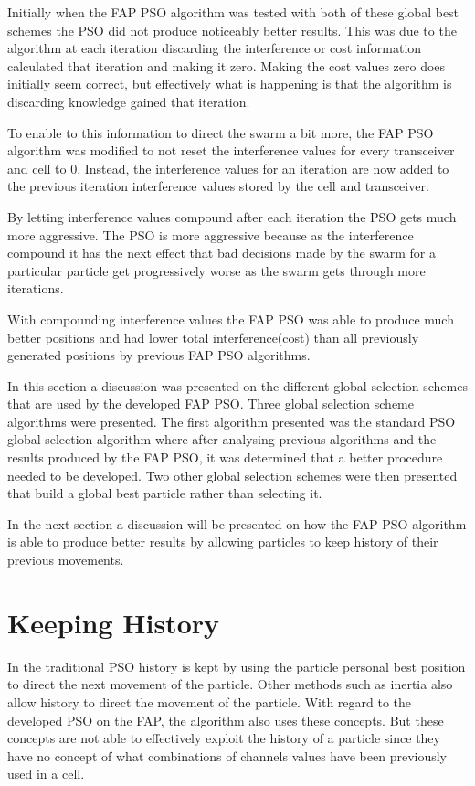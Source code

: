 Initially when the FAP PSO algorithm was tested with both of these global best schemes the PSO did not produce noticeably better results. This was due to the algorithm at each iteration discarding the interference or cost information calculated that iteration and making it zero. Making the cost values zero does initially seem correct, but effectively what is happening is that the algorithm is discarding knowledge gained that iteration.

To enable to this information to direct the swarm a bit more, the FAP PSO algorithm was modified to not reset the interference values for every transceiver and cell to 0. Instead, the interference values for an iteration are now added to the previous iteration interference values stored by the cell and transceiver. 

By letting interference values compound after each iteration the PSO gets much more aggressive. The PSO is more aggressive because as the interference compound it has the next effect that bad decisions made by the swarm for a particular particle get progressively worse as the swarm gets through more iterations.

With compounding interference values the FAP PSO was able to produce much better positions and had lower total interference(cost) than all previously generated positions by previous FAP PSO algorithms. 

In this section a discussion was presented on the different global selection schemes that are used by the developed FAP PSO. Three global selection scheme algorithms were presented. The first algorithm presented was the standard PSO global selection algorithm where after analysing previous algorithms and the results produced by the FAP PSO, it was determined that a better procedure needed to be developed. Two other global selection schemes were then presented that build a global best particle rather than selecting it.

In the next section a discussion will be presented on how the FAP PSO algorithm is able to produce better results by allowing particles to keep history of their previous movements.
\section{Keeping History}
\label{sec:keepinghistory}
In the traditional PSO history is kept by using the particle personal best position to direct the next movement of the particle. Other methods such as inertia also allow history to direct the movement of the particle. With regard to the developed PSO on the FAP, the algorithm also uses these concepts. But these concepts are not able to effectively exploit the history of a particle since they have no concept of what combinations of channels values have been previously used in a cell.

